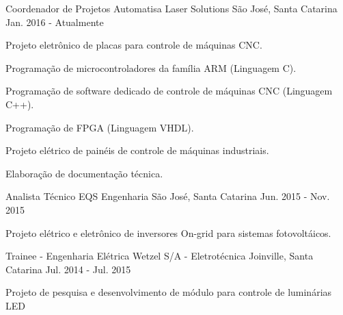 

\begin{cventries}




  \cventry
    {Coordenador de Projetos} %
    {Automatisa Laser Solutions} %
    {São José, Santa Catarina} %
    {Jan. 2016 - Atualmente} %
    {
      \begin{cvitems} %
	\item {Projeto eletrônico de placas para controle de máquinas CNC.}	
        \item {Programação de microcontroladores da família ARM (Linguagem C).}
        \item {Programação de software dedicado de controle de máquinas CNC (Linguagem C++).}
	\item {Programação de FPGA (Linguagem VHDL).}
	\item {Projeto elétrico de painéis de controle de máquinas industriais.}
        \item {Elaboração de documentação técnica.}
      \end{cvitems}
    }

  \cventry
    {Analista Técnico} %
    {EQS Engenharia} %
    {São José, Santa Catarina} %
    {Jun. 2015 - Nov. 2015} %
    {
      \begin{cvitems} %
        \item {Projeto elétrico e eletrônico de inversores On-grid para sistemas fotovoltáicos.}
      \end{cvitems}
    }

  \cventry
    {Trainee - Engenharia Elétrica} %
    {Wetzel S/A - Eletrotécnica} %
    {Joinville, Santa Catarina} %
    {Jul. 2014 - Jul. 2015} %
    {
      \begin{cvitems} %
        \item {Projeto de pesquisa e desenvolvimento de módulo para controle de luminárias LED}
      \end{cvitems}
    }


\end{cventries}
